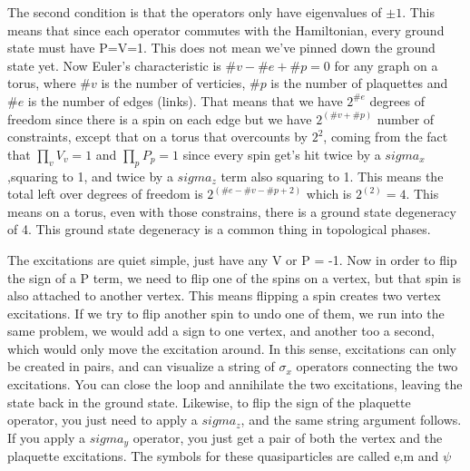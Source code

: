 The second condition is that the operators only have eigenvalues of $\pm 1 $. This means that since each operator commutes with the Hamiltonian, every ground state must have P=V=1. This does not mean we've pinned
down the ground state yet. Now Euler's characteristic is $\#v-\#e+\#p = 0$ for any graph on a torus, where $\#v$ is the number of verticies, $\#p$ is the number of plaquettes and $\#e$ is the number of edges (links). That means that we have $ 2^{\#e} $ degrees of freedom since there is a spin on each edge but we have $2^(\#v+\#p)$ number of constraints, except that on a torus that overcounts by $2^2$, coming from the fact that $ \prod_v V_v =1 $ and $ \prod_p P_p =1 $ since every spin get's hit twice by a $ sigma_x $,squaring to 1, and twice by a $sigma_z$ term also squaring to 1. This means the total left over degrees of freedom is $ 2^(\#e-\#v-\#p+2) $ which is $2^(2)=4$. This means on a torus, even with those constrains, there is a ground state degeneracy of 4. This ground state degeneracy is a common thing in topological phases. 

The excitations are quiet simple, just have any V or P = -1. Now in order to flip the sign of a P term, we need to flip one of the spins on a vertex, but that spin is also attached to another vertex. This means flipping a spin creates two vertex excitations. If we try to flip another spin to undo one of them, we run into the same problem, we would add a sign to one vertex, and another too a second, which would only move the excitation around. In this sense, excitations can only be created in pairs, and can visualize a string of $\sigma_x$ operators connecting the two excitations. You can close the loop and annihilate the two excitations, leaving the state back in the ground state. Likewise, to flip the sign of the plaquette operator, you just need to apply a $sigma_z$, and the same string argument follows. If you apply a $sigma_y$ operator, you just get a pair of both the vertex and the plaquette excitations. The symbols for these quasiparticles are called e,m and $\psi$